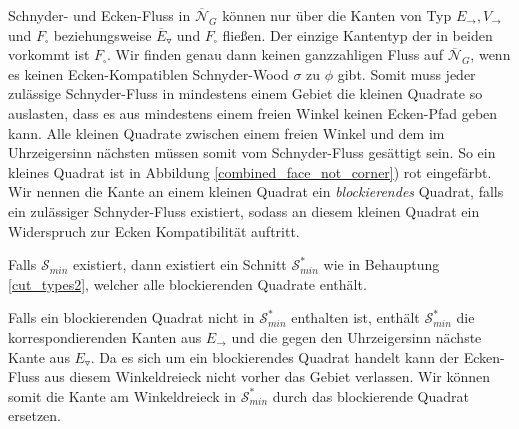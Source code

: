 Schnyder- und Ecken-Fluss in $\overline{\mathcal{N}}_G$ können nur über die Kanten von Typ $E_\to, V_\to$ und $F_\square$ beziehungsweise $\overline{E}_\triangledown$ und $F_\square$ fließen. Der einzige Kantentyp der in beiden vorkommt ist $F_\square$. Wir finden genau dann keinen ganzzahligen Fluss auf $\overline{\mathcal{N}}_G$, wenn es keinen Ecken-Kompatiblen Schnyder-Wood $\sigma$ zu $\phi$ gibt. Somit muss jeder zulässige Schnyder-Fluss in mindestens einem Gebiet die kleinen Quadrate so auslasten, dass es aus mindestens einem freien Winkel keinen Ecken-Pfad geben kann. Alle kleinen Quadrate zwischen einem freien Winkel und dem im Uhrzeigersinn nächsten müssen somit vom Schnyder-Fluss gesättigt sein. So ein kleines Quadrat ist in Abbildung \ref{combined_face_not_corner}) rot eingefärbt. Wir nennen die Kante an einem kleinen Quadrat ein \textit{blockierendes} Quadrat, falls ein zulässiger Schnyder-Fluss existiert, sodass an diesem kleinen Quadrat ein Widerspruch zur Ecken Kompatibilität auftritt.

\begin{claim}
Falls $\mathcal{S}_{min}$ existiert, dann existiert ein Schnitt $\mathcal{S}^*_{min}$ wie in Behauptung \ref{cut_types2}, welcher alle blockierenden Quadrate enthält.
\end{claim}

Falls ein blockierenden Quadrat nicht in $\mathcal{S}^*_{min}$ enthalten ist, enthält $\mathcal{S}^*_{min}$ die korrespondierenden Kanten aus $E_\to$ und die gegen den Uhrzeigersinn nächste Kante aus $E_\triangledown$. Da es sich um ein blockierendes Quadrat handelt kann der Ecken-Fluss aus diesem Winkeldreieck nicht vorher das Gebiet verlassen. Wir können somit die Kante am Winkeldreieck in $\mathcal{S}^*_{min}$ durch das blockierende Quadrat ersetzen.

